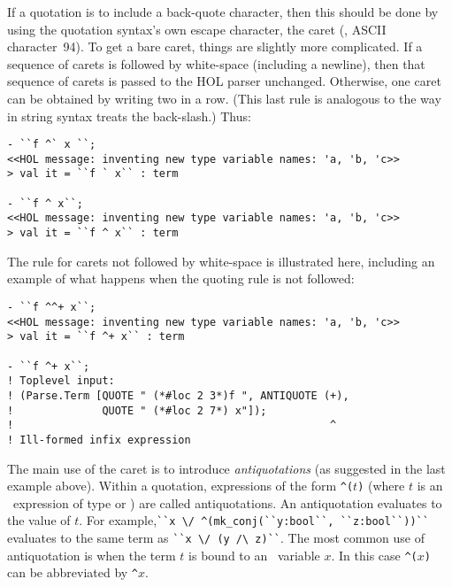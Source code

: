 If a quotation is to include a back-quote character, then this should
be done by using the quotation syntax's own escape character, the
caret (\ml{\^}, ASCII character~94).  To get a bare caret, things are
slightly more complicated.  If a sequence of carets is followed by
white-space (including a newline), then that sequence of carets is
passed to the HOL parser unchanged.  Otherwise, one caret can be
obtained by writing two in a row. (This last rule is analogous to the
way in \ML{} string syntax treats the back-slash.) Thus:
\begin{session}
\begin{verbatim}
- ``f ^` x ``;
<<HOL message: inventing new type variable names: 'a, 'b, 'c>>
> val it = ``f ` x`` : term

- ``f ^ x``;
<<HOL message: inventing new type variable names: 'a, 'b, 'c>>
> val it = ``f ^ x`` : term
\end{verbatim}
\end{session}

The rule for carets not followed by white-space is illustrated here,
including an example of what happens when the quoting rule is not
followed:
\begin{session}
\begin{verbatim}
- ``f ^^+ x``;
<<HOL message: inventing new type variable names: 'a, 'b, 'c>>
> val it = ``f ^+ x`` : term

- ``f ^+ x``;
! Toplevel input:
! (Parse.Term [QUOTE " (*#loc 2 3*)f ", ANTIQUOTE (+),
!              QUOTE " (*#loc 2 7*) x"]);
!                                                  ^
! Ill-formed infix expression
\end{verbatim}
\end{session}

The main use of the caret is to introduce \emph{antiquotations} (as
suggested in the last example above).  Within a quotation, expressions
of the form {\small\verb+^(+}$t${\small\verb+)+}
%
%
(where $t$ is an \ML\ expression of type
%
%
 or ) are called antiquotations.
%
%
An antiquotation  evaluates to the
\ML{} value of $t$. For example,{\small\verb+``x \/ ^(mk_conj(``y:bool``, ``z:bool``))``+}
evaluates to the same term as {\small\verb+``x \/ (y /\ z)``+}. The
most common use of antiquotation is when the term $t$ is bound to an \ML\
variable $x$. In this case {\small\verb+^(+}$x${\small\verb+)+} can be
abbreviated by {\small\verb+^+}$x$.

